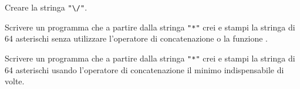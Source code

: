 \begin{Exercise}[label=string-03]
Creare la stringa \verb|"\/"|.
\end{Exercise}

\begin{Exercise}[label=string-04]
Scrivere un programma che a partire dalla stringa \verb|"*"| crei e stampi la
stringa di 64 asterischi senza utilizzare l'operatore di concatenazione o la
funzione .
\end{Exercise}

\begin{Exercise}[label=string-05]
Scrivere un programma che a partire dalla stringa \verb|"*"| crei e stampi
la stringa di 64 asterischi usando l'operatore di concatenazione il minimo
indispensabile di volte.
\end{Exercise}

